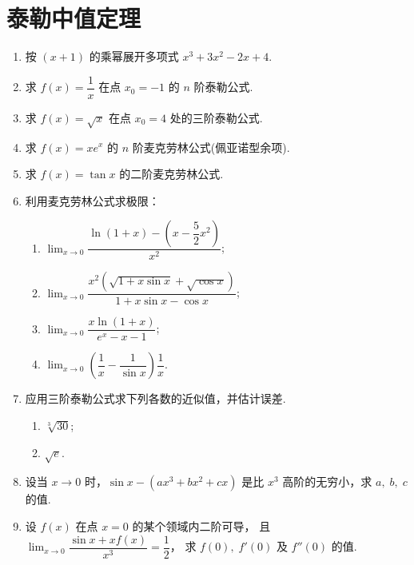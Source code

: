 \section{泰勒中值定理}

\begin{enumerate}\setlength{\itemsep}{7pt}
    \item 按 $(x+1)$ 的乘幂展开多项式 $x^3+3x^2-2x+4$.
    
    \item 求 $f(x)=\dfrac{1}{x}$ 在点 $x_0=-1$ 的 $n$ 阶泰勒公式.
    
    \item 求 $f(x)=\sqrt{x}$ 在点 $x_0=4$ 处的三阶泰勒公式.
    
    \item 求 $f(x)=xe^x$ 的 $n$ 阶麦克劳林公式(佩亚诺型余项).
    
    \item 求 $f(x)=\tan x$ 的二阶麦克劳林公式.
    
    \item 利用麦克劳林公式求极限：
    \begin{enumerate}[(1)]\setlength{\itemsep}{5pt}\setlength{\topsep}{15pt}
        \item $\displaystyle\lim_{x\to0}\dfrac{\ln(1+x)-\left(x-\dfrac{5}{2}x^2\right)}{x^2}$;
        \item $\displaystyle\lim_{x\to0}\dfrac{x^2(\sqrt{1+x\sin x}+\sqrt{\cos x})}{1+x\sin x-\cos x}$;
        \item $\displaystyle\lim_{x\to0}\dfrac{x\ln(1+x)}{e^x-x-1}$;
        \item $\displaystyle\lim_{x\to0}\left(\dfrac{1}{x}-\dfrac{1}{\sin x}\right)\dfrac{1}{x}$.
    \end{enumerate}

    \item 应用三阶泰勒公式求下列各数的近似值，并估计误差.
    \begin{enumerate}[(1)]\setlength{\itemsep}{5pt}\setlength{\topsep}{15pt}
        \item $\sqrt[3]{30}$;
        \item $\sqrt{e}$.
    \end{enumerate}

    \item 设当 $x\to0$ 时，$\sin x-(ax^3+bx^2+cx)$ 是比 $x^3$ 高阶的无穷小，求 $a,\;b,\;c$ 的值.
    
    \item 设 $f(x)$ 在点 $x=0$ 的某个领域内二阶可导，
    且 $\displaystyle\lim_{x\to0}\dfrac{\sin x+xf(x)}{x^3}=\dfrac{1}{2}$，
    求 $f(0),\;f'(0)$ 及 $f''(0)$ 的值.


\end{enumerate}
